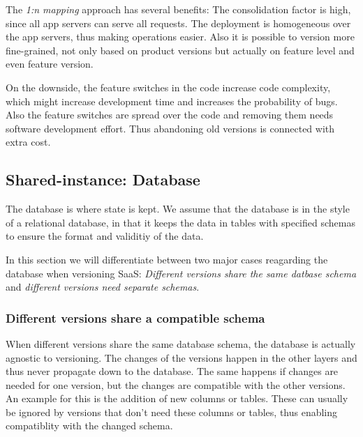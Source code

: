 The \emph{1:n mapping} approach has several benefits: The consolidation factor is high, since all app servers can serve all requests. The deployment is homogeneous over the app servers, thus making operations easier. Also it is possible to version more fine-grained, not only based on product versions but actually on feature level and even feature version.

On the downside, the feature switches in the code increase code complexity, which might increase development time and increases the probability of bugs. Also the feature switches are spread over the code and removing them needs software development effort. Thus abandoning old versions is connected with extra cost.

%
%
%

\subsection{Shared-instance: Database}
\label{sec:database}

The database is where state is kept. We assume that the database is in the style of a relational database, in that it keeps the data in tables with specified schemas to ensure the format and validitiy of the data.

In this section we will differentiate between two major cases reagarding the database when versioning SaaS: \emph{Different versions share the same datbase schema} and \emph{different versions need separate schemas}.

\subsubsection{Different versions share a compatible schema}

When different versions share the same database schema, the database is actually agnostic to versioning. The changes of the versions happen in the other layers and thus never propagate down to the database. The same happens if changes are needed for one version, but the changes are compatible with the other versions. An example for this is the addition of new columns or tables. These can usually be ignored by versions that don't need these columns or tables, thus enabling compatiblity with the changed schema.

